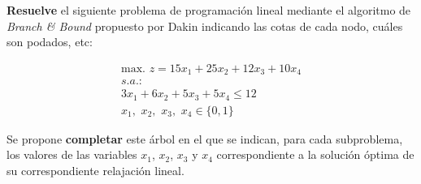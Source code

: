 \textbf{Resuelve} el siguiente problema de programación lineal mediante el algoritmo de \textit{Branch \& Bound} propuesto por Dakin indicando las cotas de cada nodo, cuáles son podados, etc:

\begin{equation}
\begin{split}
\mbox{max. } z = 15x_1 + 25x_2 +12x_3+10x_4\\
s.a.:\\
3x_1 + 6x_2 +5x_3 + 5x_4 \leq  12\\
x_1,\,\,x_2,\,\,x_3,\,\,x_4 \in  \{0,1\}
\end{split}
\end{equation}


Se propone \textbf{completar} este árbol en el que se indican, para cada subproblema, los valores de las variables $x_1$, $x_2$, $x_3$ y $x_4$ correspondiente a la solución óptima de su correspondiente relajación lineal.

\begin{figure}[h!]
    \begin{center}
    \end{center}
\end{figure}